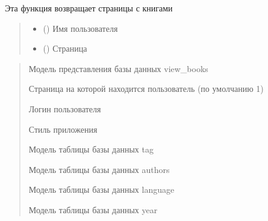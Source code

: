 \documentclass[letterpaper,10pt,russian]{sphinxmanual}
\begin{document}
\begin{fulllineitems}
\label{\detokenize{blueprints:blueprints.select_books.books}}
\pysigstartsignatures
{}
\pysigstopsignatures
\sphinxAtStartPar
Эта функция возвращает страницы с книгами
\begin{quote}\begin{description}
\begin{itemize}
\item {} 
\sphinxAtStartPar
{} () \textendash{} Имя пользователя

\item {} 
\sphinxAtStartPar
{} () \textendash{} Страница

\end{itemize}

\end{description}\end{quote}
\begin{description}
\begin{quote}\begin{description}
\sphinxAtStartPar
Модель представления базы данных view\_books

\sphinxAtStartPar
Страница на которой находится пользователь (по умолчанию 1)

\sphinxAtStartPar
Логин пользователя

\sphinxAtStartPar
Стиль приложения

\sphinxAtStartPar
Модель таблицы базы данных tag

\sphinxAtStartPar
Модель таблицы базы данных authors

\sphinxAtStartPar
Модель таблицы базы данных language

\sphinxAtStartPar
Модель таблицы базы данных year


\end{description}
\end{quote}
\end{description}
\end{fulllineitems}
\end{document}
